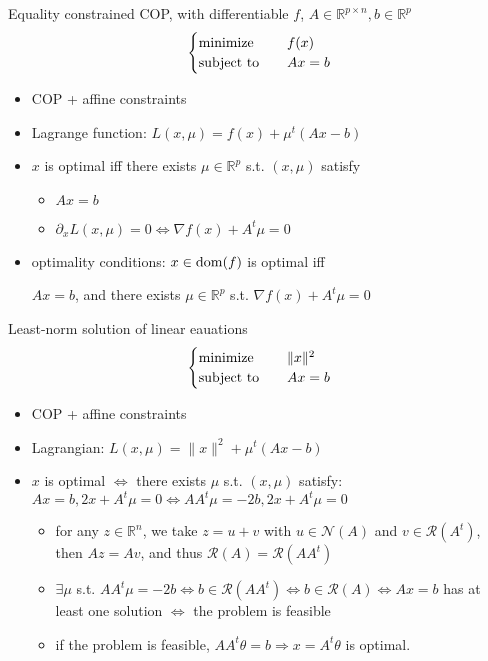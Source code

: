 \begin{remark}
    Equality constrained COP, with differentiable $f$, $A \in \mathbb{R}^{p \times n}, b \in \mathbb{R}^p$\[\begin{cases}
        \operatorname{minimize} \quad &f(x)\\
        \operatorname{subject\ to} \quad &Ax = b
    \end{cases}\]
    \begin{itemize}
        \item COP + affine constraints
        \item Lagrange function: $L(x, \mu) = f(x) + \mu^t(Ax - b)$
        \item $x$ is optimal iff there exists $\mu \in \mathbb{R}^p$ s.t. $(x, \mu)$ satisfy\begin{itemize}
            \item $Ax = b$
            \item $\partial_xL(x, \mu) = 0 \Longleftrightarrow \nabla f(x) + A^t\mu = 0$
        \end{itemize}
        \item optimality conditions: $x \in \operatorname{dom}(f)$ is optimal iff\begin{center}
            $Ax = b$, and there exists $\mu \in \mathbb{R}^p$ s.t. $\nabla f(x) + A^t\mu = 0$
        \end{center}
    \end{itemize}
\end{remark}

\begin{remark}
    Least-norm solution of linear eauations\[\begin{cases}
        \operatorname{minimize} \quad &\|x\|^2\\
        \operatorname{subject\ to} \quad &Ax = b
    \end{cases}\]
    \begin{itemize}
        \item COP + affine constraints
        \item Lagrangian: $L(x, \mu) = \|x\|^2 + \mu^t(Ax - b)$
        \item $x$ is optimal $\Longleftrightarrow$ there exists $\mu$ s.t. $(x, \mu)$ satisfy: $Ax = b, 2x + A^t\mu = 0 \Longleftrightarrow AA^t\mu = -2b, 2x + A^t\mu = 0$\begin{itemize}
            \item for any $z \in \mathbb{R}^n$, we take $z = u + v$ with $u \in \mathcal{N}(A)$ and $v \in \mathcal{R}(A^t)$, then $Az = Av$, and thus $\mathcal{R}(A) = \mathcal{R}(AA^t)$
            \item $\exists \mu$ s.t. $AA^t\mu = -2b \Longleftrightarrow b\in \mathcal{R}(AA^t) \Longleftrightarrow b \in \mathcal{R}(A) \Longleftrightarrow Ax = b$ has at least one solution $\Longleftrightarrow$ the problem is feasible
            \item if the problem is feasible, $AA^t\theta = b \Longrightarrow x = A^t\theta$ is optimal.
        \end{itemize} 
    \end{itemize}
\end{remark}

